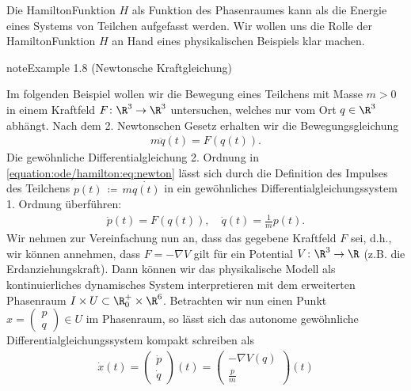 \documentclass[letterpaper,10pt,german]{jupyterBook}
\begin{document}
\sphinxAtStartPar
Die Hamilton\sphinxhyphen{}Funktion \(H\) als Funktion des Phasenraumes kann als die Energie eines Systems von Teilchen aufgefasst werden.
Wir wollen uns die Rolle der Hamilton\sphinxhyphen{}Funktion \(H\) an Hand eines physikalischen Beispiels klar machen.
\label{ode/hamilton:example-3}
\begin{sphinxadmonition}{note}{Example 1.8 (Newtonsche Kraftgleichung)}



\sphinxAtStartPar
Im folgenden Beispiel wollen wir die Bewegung eines Teilchens mit Masse \(m>0\) in einem Kraftfeld \(F \colon \R^3 \rightarrow \R^3\)  untersuchen, welches nur vom Ort \(q \in \R^3\) abhängt.
Nach dem 2. Newtonschen Gesetz erhalten wir die Bewegungsgleichung
\begin{equation}\label{equation:ode/hamilton:eq:newton}
\begin{split}m\ddot{q}(t) = F(q(t)).\end{split}
\end{equation}
\sphinxAtStartPar
Die gewöhnliche Differentialgleichung 2. Ordnung in \eqref{equation:ode/hamilton:eq:newton} lässt sich durch die Definition des Impulses des Teilchens \(p(t) \, \coloneqq \, m \dot{q(t)}\) in ein gewöhnliches Differentialgleichungssystem 1. Ordnung überführen:
\begin{equation*}
\begin{split}\dot{p}(t) = F(q(t)), \quad \dot{q}(t) = \frac{1}{m}p(t).\end{split}
\end{equation*}
\sphinxAtStartPar
Wir nehmen zur Vereinfachung nun an, dass das gegebene Kraftfeld \(F\)  sei, d.h., wir können annehmen, dass \(F = - \nabla V\) gilt für ein Potential \(V \colon \R^3 \rightarrow \R\) (z.B. die Erdanziehungskraft).
Dann können wir das physikalische Modell als kontinuierliches dynamisches System interpretieren mit dem erweiterten Phasenraum \(I \times U \subset \R^+_0 \times \R^6\).
Betrachten wir nun einen Punkt \(x = \begin{pmatrix} p \\ q\end{pmatrix} \in U\) im Phasenraum, so lässt sich das autonome gewöhnliche Differentialgleichungssystem kompakt schreiben als
\begin{equation}\label{equation:ode/hamilton:eq:newton_DGL}
\begin{split}\dot{x}(t) = \begin{pmatrix} \dot{p} \\ \dot{q} \end{pmatrix}(t) = \begin{pmatrix} -\nabla V(q) \\ \frac{p}{m} \end{pmatrix}(t)\end{split}

\end{equation}
\end{sphinxadmonition}
\end{document}
